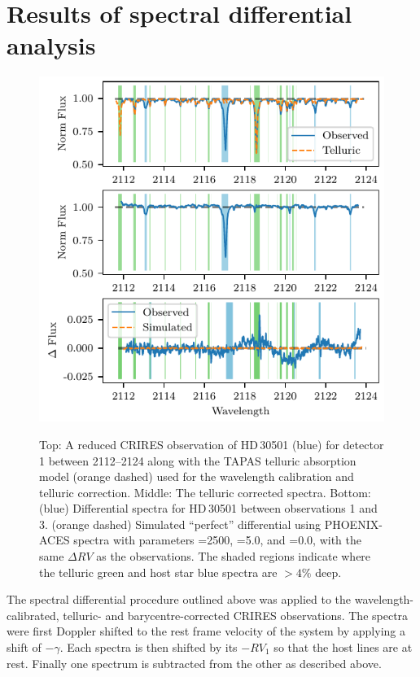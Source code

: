 
\section{Results of spectral differential analysis}
\label{subsec:differential_results}

\begin{figure}
    \centering
    \includegraphics[width=0.8\hsize]{figures/direct-recovery/differential.pdf}\\
    \caption[Example of the spectral differential technique.]{Top: A reduced {CRIRES} observation of {HD\,30501} (blue) for detector 1 between 2112--2124\nm{} along with the {TAPAS} telluric absorption model ({orange} dashed) used for the wavelength calibration and telluric correction.
        Middle: The telluric corrected spectra.
        Bottom: ({blue}) Differential spectra for {HD\,30501} between observations 1 and 3.
        ({orange} dashed) Simulated ``perfect'' differential using {PHOENIX-ACES} spectra with parameters \Teff{}=2500\K{}, \Logg{}=5.0, and \feh{}=0.0, with the same \(\Delta {RV}\) as the observations.
        The shaded regions indicate where the telluric {green} and host star {blue} spectra are \(> 4\%\) deep.}
    \label{fig:spectral_example}
\end{figure}

The spectral differential procedure outlined above was applied to the wavelength-calibrated, telluric- and barycentre-corrected {CRIRES} observations.
The spectra were first Doppler shifted to the rest frame velocity of the system by applying a shift of \(-\gamma\).
Each spectra is then shifted by its $-{RV}_{1}$ so that the host lines are at rest.
Finally one spectrum is subtracted from the other as described above.

